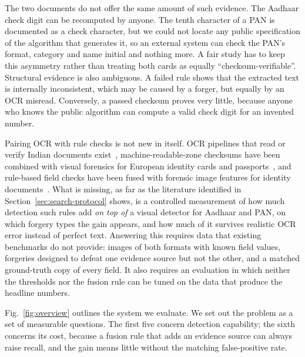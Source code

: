\documentclass[12pt]{article}
\begin{document}
The two documents do not offer the same amount of such evidence. The
Aadhaar check digit can be recomputed by anyone. The tenth character of
a PAN is documented as a check character, but we could not locate any
public specification of the algorithm that generates it, so an external
system can check the PAN's format, category and name initial and
nothing more. A fair study has to keep
this asymmetry rather than treating both cards as equally
``checksum-verifiable''. Structural evidence is also ambiguous. A
failed rule shows that the extracted text is internally inconsistent,
which may be caused by a forger, but equally by an OCR misread.
Conversely, a passed checksum proves very little, because anyone who
knows the public algorithm can compute a valid check digit for an
invented number.

Pairing OCR with rule checks is not new in itself.
OCR pipelines that read or verify Indian documents
exist~\cite{raghuvanshi,panens}, machine-readable-zone checksums have
been combined with visual forensics for European identity cards and
passports~\cite{dai}, and rule-based field checks have been fused with
forensic image features for identity documents~\cite{limconnie}. What is
missing, as far as the literature identified in
Section~\ref{sec:search-protocol} shows, is a controlled measurement of
how much detection such rules add \emph{on top of} a visual detector for
Aadhaar and PAN, on which forgery types the gain appears, and how much
of it survives realistic OCR error instead of perfect text. Answering
this requires data that existing benchmarks do not provide: images of
both formats with known field values, forgeries designed to defeat one
evidence source but not the other, and a matched ground-truth copy of
every field. It also requires an evaluation in which neither the
thresholds nor the fusion rule can be tuned on the data that produce
the headline numbers.

Fig.~\ref{fig:overview} outlines the system we evaluate. We set out
the problem as a set of measurable questions. The
first five concern detection capability; the sixth concerns its cost,
because a fusion rule that adds an evidence source can always raise
recall, and the gain means little without the matching false-positive
rate.
\end{document}
